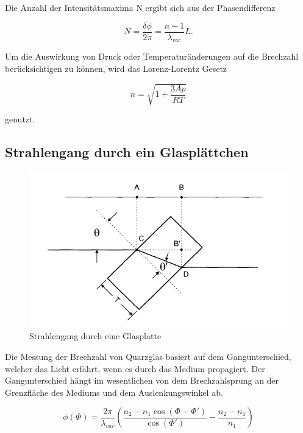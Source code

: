 Die Anzahl der Intensitätsmaxima N ergibt sich aus der Phasendifferenz

\begin{equation}
N=\frac{\delta \phi}{2 \pi} = \frac{n-1}{\lambda_{vac}} L.
\end{equation}

Um die Auswirkung von Druck oder Temperaturänderungen auf die Brechzahl berücksichtigen zu können, wird das Lorenz-Lorentz Gesetz

\begin{equation}
	n = \sqrt{1 + \frac{3Ap}{RT}}
	\label{n_gas}
\end{equation}

genutzt.

\subsection{Strahlengang durch ein Glasplättchen}

\begin{figure}[h]
\centering
\includegraphics[scale=0.8]{img/glasPlatte.PNG}
\caption{Strahlengang durch eine Glasplatte \cite{FP}}
\label{Glasplatte}
\end{figure}

Die Messung der Brechzahl von Quarzglas basiert auf dem Gangunterschied, welcher das Licht erfährt, wenn es durch das Medium propagiert.
Der Gangunterschied hängt im wesentlichen von dem Brechzahlsprung an der Grenzfläche des Mediums und dem Auslenkungswinkel ab.

\begin{equation}
\phi(\Phi) = \frac{2 \pi}{\lambda_{vac}} \left( \frac{n_2 - n_1 \cos(\Phi - \Phi')}{\cos(\Phi')} - \frac{n_2 - n_1}{n_1}\right)
\end{equation}

